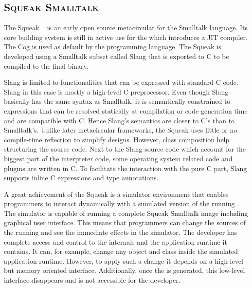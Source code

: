 \subsection*{\textsc{Squeak Smalltalk \VM}}
The Squeak \VM~\cite{Inga97a} is an early open source metacircular \VM for the Smalltalk language. 
Its core building system is still in active use for the  which introduces a JIT compiler.
The Cog \VM is used as default by the  programming language.
The Squeak \VM is developed using a Smalltalk subset called Slang that is exported to C to be compiled to the final \VM binary.

Slang is limited to functionalities that can be expressed with standard C code.
Slang in this case is mostly a high-level C preprocessor.
Even though Slang basically has the same syntax as Smalltalk, it is semantically constrained to expressions that can be resolved statically at compilation or code generation time and are compatible with C.
Hence Slang's semantics are closer to C's than to Smalltalk's.
Unlike later metacircular frameworks, the Squeak \VM uses little or no compile-time reflection to simplify \VM designs.
However, class composition help structuring the source code.
Next to the Slang source code which account for the biggest part of the interpreter code, some operating system related code and plugins are written in C.
To facilitate the interaction with the pure C part, Slang supports inline C expressions and type annotations.

A great achievement of the Squeak \VM is a simulator environment that enables programmers to interact dynamically with a simulated version of the running \VM.
The simulator is capable of running a complete Squeak Smalltalk image including graphical user interface.
This means that programmers can change the sources of the running \VM and see the immediate effects in the simulator.
The \VM developer has complete access and control to the \VM internals and the application runtime it contains. It can, for example, change any object and class inside the simulated application runtime. However, to apply such a change it depends on a high-level but memory oriented interface. Additionally, once the \VM is generated, this low-level interface disappears and is not accessible for the developer.

